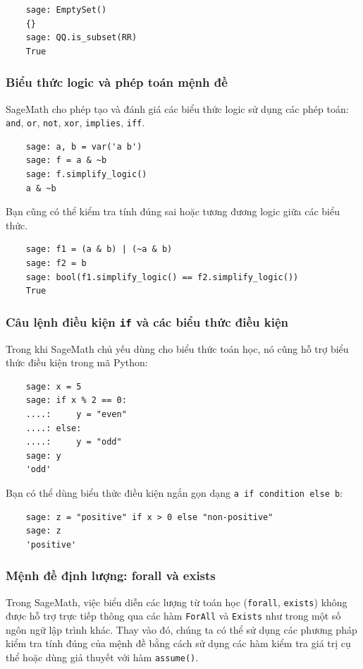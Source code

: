 \begin{lstlisting}
	sage: EmptySet()
	{}
	sage: QQ.is_subset(RR)
	True
\end{lstlisting}

\subsubsection{Biểu thức logic và phép toán mệnh đề}

SageMath cho phép tạo và đánh giá các biểu thức logic sử dụng các phép toán: \texttt{and}, \texttt{or}, \texttt{not}, \texttt{xor}, \texttt{implies}, \texttt{iff}.

\begin{lstlisting}
	sage: a, b = var('a b')
	sage: f = a & ~b
	sage: f.simplify_logic()
	a & ~b
\end{lstlisting}

Bạn cũng có thể kiểm tra tính đúng sai hoặc tương đương logic giữa các biểu thức.

\begin{lstlisting}
	sage: f1 = (a & b) | (~a & b)
	sage: f2 = b
	sage: bool(f1.simplify_logic() == f2.simplify_logic())
	True
\end{lstlisting}

\subsubsection{Câu lệnh điều kiện \texttt{if} và các biểu thức điều kiện}

Trong khi SageMath chủ yếu dùng cho biểu thức toán học, nó cũng hỗ trợ biểu thức điều kiện trong mã Python:

\begin{lstlisting}
	sage: x = 5
	sage: if x % 2 == 0:
	....:     y = "even"
	....: else:
	....:     y = "odd"
	sage: y
	'odd'
\end{lstlisting}

Bạn có thể dùng biểu thức điều kiện ngắn gọn dạng \texttt{a if condition else b}:

\begin{lstlisting}
	sage: z = "positive" if x > 0 else "non-positive"
	sage: z
	'positive'
\end{lstlisting}

\subsubsection{Mệnh đề định lượng: forall và exists}

Trong SageMath, việc biểu diễn các lượng từ toán học (\texttt{forall}, \texttt{exists}) không được hỗ trợ trực tiếp thông qua các hàm \texttt{ForAll} và \texttt{Exists} như trong một số ngôn ngữ lập trình khác. Thay vào đó, chúng ta có thể sử dụng các phương pháp kiểm tra tính đúng của mệnh đề bằng cách sử dụng các hàm kiểm tra giá trị cụ thể hoặc dùng giả thuyết với hàm \texttt{assume()}.

